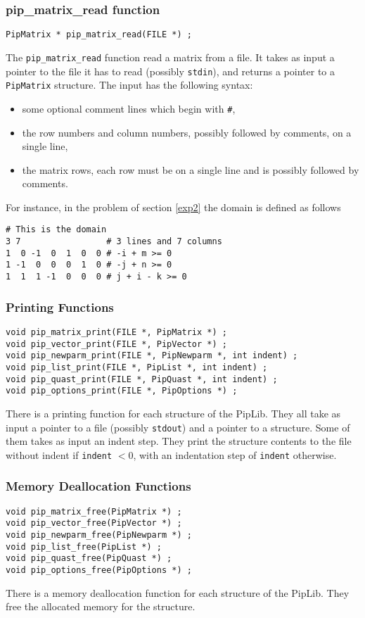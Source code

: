 \documentclass[12pt,a4paper,dvips]{article}
\begin{document}
\subsubsection{pip\_matrix\_read function}
\begin{verbatim}
PipMatrix * pip_matrix_read(FILE *) ;
\end{verbatim}
The {\tt pip\_matrix\_read} function read a matrix from a file. It takes
as input a pointer to the file it has to read (possibly {\tt stdin}), and
returns a pointer to a {\tt PipMatrix} structure. The input has the following syntax:
\begin{itemize}
\item some optional comment lines which begin with {\tt \#},
\item the row numbers and column numbers, possibly followed by comments,
      on a single line,
\item the matrix rows, each row must be on a single line and is possibly
      followed by comments.
\end{itemize}
For instance, in the problem of section \ref{exp2} the domain is defined as follows
\begin{verbatim}
# This is the domain
3 7                 # 3 lines and 7 columns
1  0 -1  0  1  0  0 # -i + m >= 0
1 -1  0  0  0  1  0 # -j + n >= 0
1  1  1 -1  0  0  0 # j + i - k >= 0
\end{verbatim}

\subsubsection{Printing Functions}
\begin{verbatim}
void pip_matrix_print(FILE *, PipMatrix *) ;
void pip_vector_print(FILE *, PipVector *) ;
void pip_newparm_print(FILE *, PipNewparm *, int indent) ;
void pip_list_print(FILE *, PipList *, int indent) ;
void pip_quast_print(FILE *, PipQuast *, int indent) ;
void pip_options_print(FILE *, PipOptions *) ;
\end{verbatim}
There is a printing function for each structure of the PipLib. They all take as input
a pointer to a file (possibly {\tt stdout}) and a pointer to a structure.
Some of them takes as input an
indent step. They print the structure contents to the file without indent if
{\tt indent} $< 0$, with an indentation step of {\tt indent} otherwise.

\subsubsection{Memory Deallocation Functions}
\begin{verbatim}
void pip_matrix_free(PipMatrix *) ;
void pip_vector_free(PipVector *) ;
void pip_newparm_free(PipNewparm *) ;
void pip_list_free(PipList *) ;
void pip_quast_free(PipQuast *) ;
void pip_options_free(PipOptions *) ;
\end{verbatim}
There is a memory deallocation function for each structure of the PipLib.
They free the allocated memory for the structure.
\end{document}
